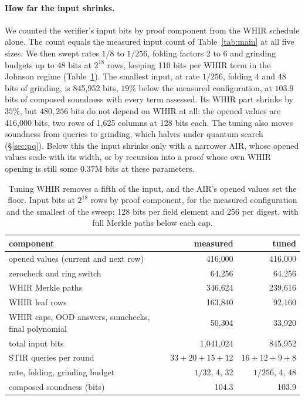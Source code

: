 \documentclass[11pt]{article}
\begin{document}
\paragraph{How far the input shrinks.} We counted the verifier's input bits by
proof component from the WHIR schedule alone. The count equals the measured input
count of Table~\ref{tab:main} at all five sizes. We then swept rates $1/8$ to
$1/256$, folding factors 2 to 6 and grinding budgets up to 48 bits at $2^{18}$
rows, keeping 110 bits per WHIR term in the Johnson regime
(Table~\ref{tab:inputs}). The smallest input, at rate $1/256$, folding 4 and 48
bits of grinding, is 845{,}952 bits, $19\%$ below the measured configuration, at
$103.9$ bits of composed soundness with every term assessed. Its WHIR part
shrinks by $35\%$, but $480{,}256$ bits do not depend on WHIR at all: the opened
values are 416{,}000 bits, two rows of 1{,}625 columns at 128 bits each. The
tuning also moves soundness from queries to grinding, which halves under quantum
search (\S\ref{sec:pq}). Below this the input shrinks only with a narrower AIR,
whose opened values scale with its width, or by recursion into a proof whose own
WHIR opening is still some $0.37$M bits at these parameters.

\begin{table}[t]\centering\small
\begin{tabular}{lrr}\toprule
component & measured & tuned\\\midrule
opened values (current and next row) & 416{,}000 & 416{,}000\\
zerocheck and ring switch & 64{,}256 & 64{,}256\\
WHIR Merkle paths & 346{,}624 & 239{,}616\\
WHIR leaf rows & 163{,}840 & 92{,}160\\
WHIR caps, OOD answers, sumchecks, final polynomial & 50{,}304 & 33{,}920\\\midrule
total input bits & 1{,}041{,}024 & 845{,}952\\
STIR queries per round & $33+20+15+12$ & $16+12+9+8$\\
rate, folding, grinding budget & $1/32$, 4, 32 & $1/256$, 4, 48\\
composed soundness (bits) & 104.3 & 103.9\\\bottomrule
\end{tabular}
\caption{Tuning WHIR removes a fifth of the input, and the AIR's opened values set
the floor. Input bits at $2^{18}$ rows by proof component, for the measured
configuration and the smallest of the sweep; 128 bits per field element and 256
per digest, with full Merkle paths below each cap.}
\label{tab:inputs}
\end{table}
\end{document}
